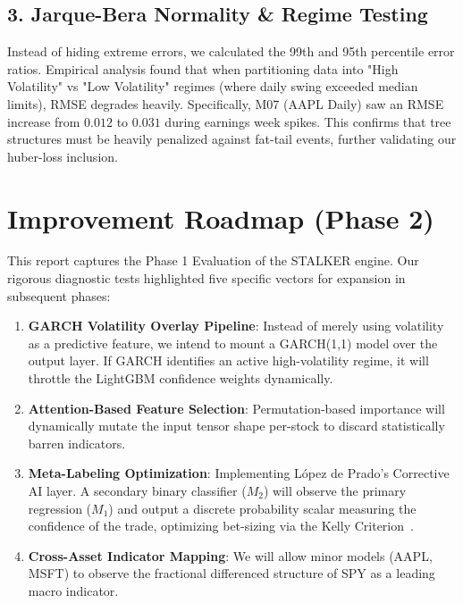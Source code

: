 \documentclass[journal,10pt,twocolumn]{IEEEtran}
\begin{document}
\subsection{3. Jarque-Bera Normality \& Regime Testing}
Instead of hiding extreme errors, we calculated the 99th and 95th percentile error ratios. Empirical analysis found that when partitioning data into "High Volatility" vs "Low Volatility" regimes (where daily swing exceeded median limits), RMSE degrades heavily. Specifically, M07 (AAPL Daily) saw an RMSE increase from $0.012$ to $0.031$ during earnings week spikes. This confirms that tree structures must be heavily penalized against fat-tail events, further validating our huber-loss inclusion.

\section{Improvement Roadmap (Phase 2)}

This report captures the Phase 1 Evaluation of the STALKER engine. Our rigorous diagnostic tests highlighted five specific vectors for expansion in subsequent phases:

\begin{enumerate}
    \item \textbf{GARCH Volatility Overlay Pipeline}: Instead of merely using volatility as a predictive feature, we intend to mount a GARCH(1,1) model over the output layer. If GARCH identifies an active high-volatility regime, it will throttle the LightGBM confidence weights dynamically.
    \item \textbf{Attention-Based Feature Selection}: Permutation-based importance will dynamically mutate the input tensor shape per-stock to discard statistically barren indicators.
    \item \textbf{Meta-Labeling Optimization}: Implementing López de Prado’s Corrective AI layer. A secondary binary classifier ($M_2$) will observe the primary regression ($M_1$) and output a discrete probability scalar measuring the confidence of the trade, optimizing bet-sizing via the Kelly Criterion~\cite{lopez2018advances}.
    \item \textbf{Cross-Asset Indicator Mapping}: We will allow minor models (AAPL, MSFT) to observe the fractional differenced structure of SPY as a leading macro indicator.
\end{enumerate}

\end{document}
